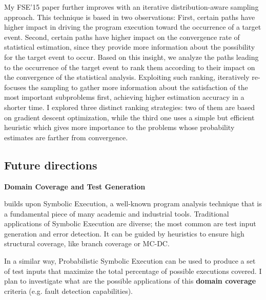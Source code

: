 \documentclass[12pt]{article}
\newcounter{list}
\begin{document}
My FSE'15 paper \cite{borges2015iterative} further improves \qCORAL
with an iterative distribution-aware sampling approach. This technique
is based in two observations: First, certain paths have higher impact
in driving the program execution toward the occurrence of a target
event. Second, certain paths have higher impact on the convergence
rate of statistical estimation, since they provide more information
about the possibility for the target event to occur. Based on this
insight, we analyze the paths leading to the occurrence of the target
event to rank them according to their impact on the convergence of the
statistical analysis.  Exploiting such ranking, \qCORAL iteratively
re-focuses the sampling to gather more information about the
satisfaction of the most important subproblems first, achieving higher
estimation accuracy in a shorter time. I explored three distinct
ranking strategies: two of them are based on gradient descent
optimization, while the third one uses a simple but efficient
heuristic which gives more importance to the problems whose
probability estimates are farther from convergence.


\subsection*{Future directions}

\noindent \textbf{Domain Coverage and Test Generation} 

\PSE{} builds upon Symbolic Execution, a well-known program analysis
technique that is a fundamental piece of many academic and industrial
tools. Traditional applications of Symbolic Execution are diverse; the
most common are test input generation and error detection. It can be
guided by heuristics to ensure high structural coverage, like branch
coverage or MC-DC.

In a similar way, Probabilistic Symbolic Execution can be used to
produce a set of test inputs that maximize the total percentage of
possible executions covered. I plan to investigate what are the
possible applications of this \textbf{domain coverage} criteria (e.g.
fault detection capabilities).



  
\end{document}
